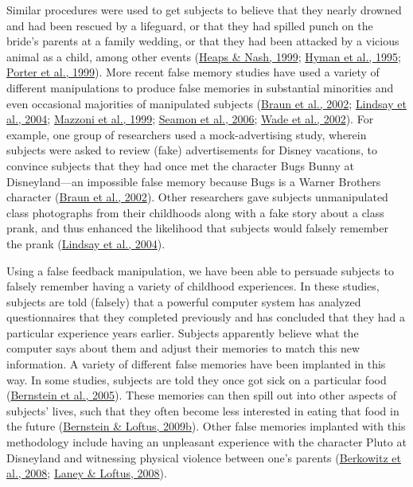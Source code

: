 \documentclass[
]{krantz}
\begin{document}
Similar procedures were used to get subjects to believe that they nearly drowned and had been rescued by a lifeguard, or that they had spilled punch on the bride's parents at a family wedding, or that they had been attacked by a vicious animal as a child, among other events (\protect\hyperlink{ref-Heaps1999}{Heaps \& Nash, 1999}; \protect\hyperlink{ref-Hyman1995}{Hyman et al., 1995}; \protect\hyperlink{ref-Porter1999}{Porter et al., 1999}). More recent false memory studies have used a variety of different manipulations to produce false memories in substantial minorities and even occasional majorities of manipulated subjects (\protect\hyperlink{ref-Braun2002}{Braun et al., 2002}; \protect\hyperlink{ref-Lindsay2004}{Lindsay et al., 2004}; \protect\hyperlink{ref-Mazzoni1999}{Mazzoni et al., 1999}; \protect\hyperlink{ref-Seamon2006}{Seamon et al., 2006}; \protect\hyperlink{ref-wade2002picture}{Wade et al., 2002}). For example, one group of researchers used a mock-advertising study, wherein subjects were asked to review (fake) advertisements for Disney vacations, to convince subjects that they had once met the character Bugs Bunny at Disneyland---an impossible false memory because Bugs is a Warner Brothers character (\protect\hyperlink{ref-Braun2002}{Braun et al., 2002}). Other researchers gave subjects unmanipulated class photographs from their childhoods along with a fake story about a class prank, and thus enhanced the likelihood that subjects would falsely remember the prank (\protect\hyperlink{ref-Lindsay2004}{Lindsay et al., 2004}).

Using a false feedback manipulation, we have been able to persuade subjects to falsely remember having a variety of childhood experiences. In these studies, subjects are told (falsely) that a powerful computer system has analyzed questionnaires that they completed previously and has concluded that they had a particular experience years earlier. Subjects apparently believe what the computer says about them and adjust their memories to match this new information. A variety of different false memories have been implanted in this way. In some studies, subjects are told they once got sick on a particular food (\protect\hyperlink{ref-Bernstein2005}{Bernstein et al., 2005}). These memories can then spill out into other aspects of subjects' lives, such that they often become less interested in eating that food in the future (\protect\hyperlink{ref-Bernstein2009b}{Bernstein \& Loftus, 2009b}). Other false memories implanted with this methodology include having an unpleasant experience with the character Pluto at Disneyland and witnessing physical violence between one's parents (\protect\hyperlink{ref-Berkowitz2008}{Berkowitz et al., 2008}; \protect\hyperlink{ref-Laney2008}{Laney \& Loftus, 2008}).
\end{document}
